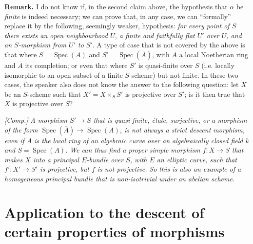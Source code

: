 \documentclass{article}
\newenvironment{rmenv}[1]
  {\phantomsection\par\medskip\noindent\textbf{#1.}\rmfamily}
  {\par\medskip}
\DeclareMathOperator{\Spec}{Spec}
\begin{document}
\begin{rmenv}{Remark}
  I do not know if, in the second claim above, the hypothesis that $\alpha$ be \emph{finite} is indeed necessary;
  we can prove that, in any case, we can ``formally'' replace it by the following, seemingly weaker, hypothesis:
  \emph{for every point of $S$ there exists an open neighbourhood $U$, a finite and faithfully flat $U'$ over $U$, and an $S$-morphism from $U'$ to $S'$}.
  A type of case that is not covered by the above is that where $S=\Spec(A)$ and $S'=\Spec(\overline{A})$, with $A$ a local Noetherian ring and $\overline{A}$ its completion;
  or even that where $S'$ is quasi-finite over $S$ (i.e. locally isomorphic to an open subset of a finite $S$-scheme) but not finite.
  In these two cases, the speaker also does not know the answer to the following question:
  let $X$ be an $S$-scheme such that $X'=X\times_S S'$ is projective over $S'$;
  is it then true that $X$ is projective over $S$?

  \emph{[Comp.]}
  \emph{A morphism $S'\to S$ that is quasi-finite, \'{e}tale, surjective, or a morphism of the form $\Spec(\overline{A})\to\Spec(A)$, is not always a strict descent morphism, even if $A$ is the local ring of an algebraic curve over an algebraically closed field $k$ and $S=\Spec(A)$.}
  \emph{We can thus find a proper simple morphism $f\colon X\to S$ that makes $X$ into a principal $E$-bundle over $S$, with $E$ an elliptic curve, such that $f'\colon X'\to S'$ is projective, but $f$ is not projective.}
  \emph{So this is also an example of a homogeneous principal bundle that is \emph{non-isotrivial} under an abelian scheme.}
\end{rmenv}


\section{Application to the descent of certain properties of morphisms}
\label{B.2}
\end{document}
